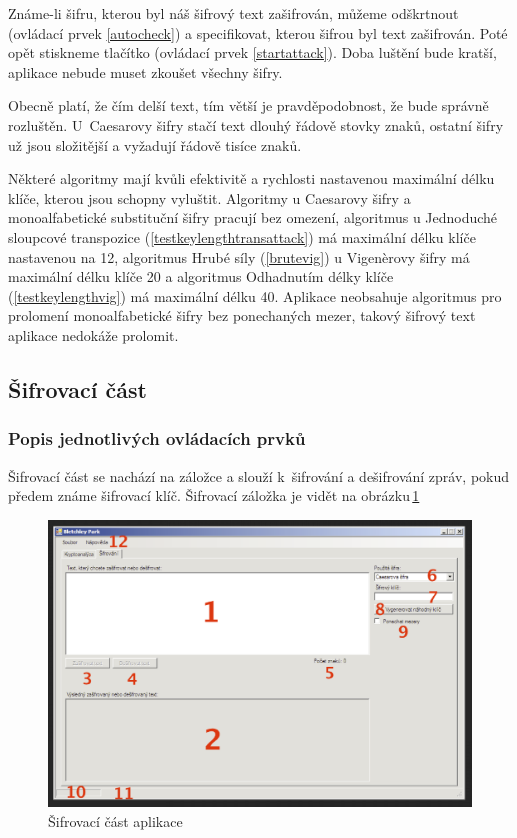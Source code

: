 \documentclass[12pt]{article}
\theoremstyle{definition}
\begin{document}
Známe-li šifru, kterou byl náš šifrový text zašifrován, můžeme odškrtnout  (ovládací prvek \ref{autocheck}) a specifikovat, kterou šifrou byl text zašifrován. Poté opět stiskneme tlačítko  (ovládací prvek \ref{startattack}). Doba luštění bude kratší, aplikace nebude muset zkoušet všechny šifry. 

Obecně platí, že čím delší text, tím větší je pravděpodobnost, že bude správně rozluštěn. U~Caesarovy šifry stačí text dlouhý řádově stovky znaků, ostatní šifry už jsou složitější a vyžadují řádově tisíce znaků. 

Některé algoritmy mají kvůli efektivitě a rychlosti nastavenou maximální délku klíče, kterou jsou schopny vyluštit. Algoritmy u Caesarovy šifry a monoalfabetické substituční šifry pracují bez omezení, algoritmus u Jednoduché sloupcové transpozice (\ref{testkeylengthtransattack}) má maximální délku klíče nastavenou na 12, algoritmus Hrubé síly (\ref{brutevig}) u Vigenèrovy šifry má maximální délku klíče 20 a algoritmus Odhadnutím délky klíče (\ref{testkeylengthvig}) má maximální délku 40. Aplikace neobsahuje algoritmus pro prolomení monoalfabetické šifry bez ponechaných mezer, takový šifrový text aplikace nedokáže prolomit. 

\subsection{Šifrovací část}
\subsubsection{Popis jednotlivých ovládacích prvků}
Šifrovací část se nachází na záložce  a slouží k~šifrování a dešifrování zpráv, pokud předem známe šifrovací klíč. Šifrovací záložka je vidět na obrázku\,\ref{img_encrypt} 

\begin{figure}[h]
  \begin{center}
  \includegraphics[scale=0.4]{images/encrypt.eps}
  \end{center}
\caption{Šifrovací část aplikace}
\label{img_encrypt}
\end{figure}
\end{document}
